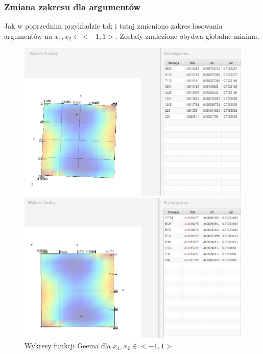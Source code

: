 \documentclass[10pt, a4paper]{article}
\begin{document}
\subsubsection{Zmiana zakresu dla argumentów}
\label{subsubsec:gemm2}
Jak w poprzednim przykładzie tak i tutaj zmieniono zakres losowania argumentów na $x_{1}, x_{2} \in <-1,1>$. Zostały znalezione obydwa globalne minima.
\begin{figure}[htbp] 
	\begin{minipage}[b]{1\textwidth}
		\centering
		\includegraphics[width=\linewidth]{images/Geeme.PNG} 
	\end{minipage} 
	 \newline\newline
	\begin{minipage}[b]{1\textwidth}
		\centering
		\includegraphics[width=\linewidth]{images/Geem2e.PNG} 
	\end{minipage}
	\caption{Wykresy funkcji Geema dla $x_{1}, x_{2} \in <-1,1>$}
	\label{fig:22}
\end{figure}
\end{document}
